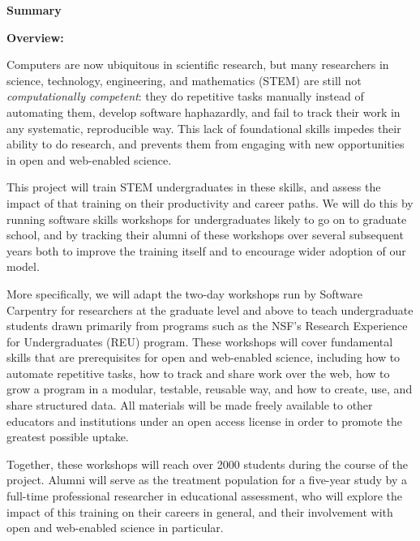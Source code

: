 \documentclass{proposalnsf}
\newlength{\up}
\begin{document}
\newpage


\begin{center}

\large\textbf{Summary}

\end{center}

\textbf{Overview:}

Computers are now ubiquitous in scientific research, but many
researchers in science, technology, engineering, and mathematics
(STEM) are still not \emph{computationally competent}: they do
repetitive tasks manually instead of automating them, develop software
haphazardly, and fail to track their work in any systematic,
reproducible way.  This lack of foundational skills impedes their
ability to do research, and prevents them from engaging with new
opportunities in open and web-enabled science.

This project will train STEM undergraduates in these skills, and
assess the impact of that training on their productivity and career
paths.  We will do this by running software skills workshops for
undergraduates likely to go on to graduate school, and by tracking
their alumni of these workshops over several subsequent years both to
improve the training itself and to encourage wider adoption of our
model.

More specifically, we will adapt the two-day workshops run by Software
Carpentry for researchers at the graduate level and above to teach
undergraduate students drawn primarily from programs such as the NSF's
Research Experience for Undergraduates (REU) program.  These workshops
will cover fundamental skills that are prerequisites for open and
web-enabled science, including how to automate repetitive tasks, how
to track and share work over the web, how to grow a program in a
modular, testable, reusable way, and how to create, use, and share
structured data.  All materials will be made freely available to other
educators and institutions under an open access license in order to
promote the greatest possible uptake.

Together, these workshops will reach over 2000 students during the
course of the project.  Alumni will serve as the treatment population
for a five-year study by a full-time professional researcher in
educational assessment, who will explore the impact of this training
on their careers in general, and their involvement with open and
web-enabled science in particular.
\end{document}

